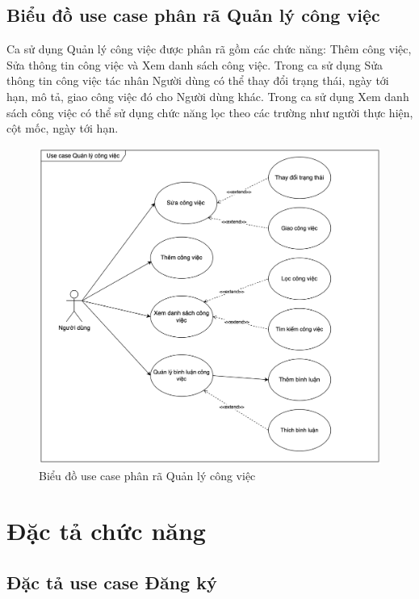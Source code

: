 \documentclass[../DoAn.tex]{subfiles}
\begin{document}
\subsection{Biểu đồ use case phân rã Quản lý công việc}
\label{subsection:2.2.5}
Ca sử dụng Quản lý công việc được phân rã gồm các chức năng: Thêm công việc, Sửa thông tin công việc và Xem danh sách công việc.
Trong ca sử dụng Sửa thông tin công việc tác nhân Người dùng có thể thay đổi trạng thái, ngày tới hạn, mô tả, giao công việc đó cho Người dùng khác.
Trong ca sử dụng Xem danh sách công việc có thể sử dụng chức năng lọc theo các trường như người thực hiện, cột mốc, ngày tới hạn.
\begin{figure}[H]
    \centering
    \includegraphics[width=1.0\linewidth]{Hinhve/TaskUseCases.png}
    \caption{Biểu đồ use case phân rã Quản lý công việc}
    \label{fig:TaskUseCases}
\end{figure}
\newpage

\section{Đặc tả chức năng}
\label{section:2.3}

\subsection{Đặc tả use case Đăng ký}
\label{subsection:2.3.1}
\end{document}
